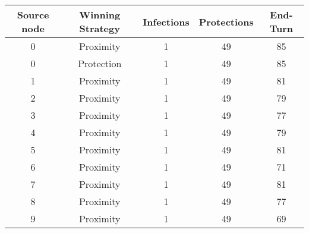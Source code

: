 \documentclass[results.tex]{subfiles}
\begin{document}
    \begin{center}
        \begin{tabular}{| c || c | c | c | c |}
            \hline
            {\bfseries Source node} & {\bfseries Winning Strategy} & {\bfseries Infections} & {\bfseries Protections}
            & {\bfseries End-Turn}
            \\  %
            \hline\hline
            0                       & Proximity                    & 1                      & 49                      & 85                   \\
            \hline
            0                       & Protection                   & 1                      & 49                      & 85                   \\
            \hline
            1                       & Proximity                    & 1                      & 49                      & 81                   \\
            \hline
            2                       & Proximity                    & 1                      & 49                      & 79                   \\
            \hline
            3                       & Proximity                    & 1                      & 49                      & 77                   \\
            \hline
            4                       & Proximity                    & 1                      & 49                      & 79                   \\
            \hline
            5                       & Proximity                    & 1                      & 49                      & 81                   \\
            \hline
            6                       & Proximity                    & 1                      & 49                      & 71                   \\
            \hline
            7                       & Proximity                    & 1                      & 49                      & 81                   \\
            \hline
            8                       & Proximity                    & 1                      & 49                      & 77                   \\
            \hline
            9                       & Proximity                    & 1                      & 49                      & 69                   \\

\end{tabular}
\end{center}
\end{document}
